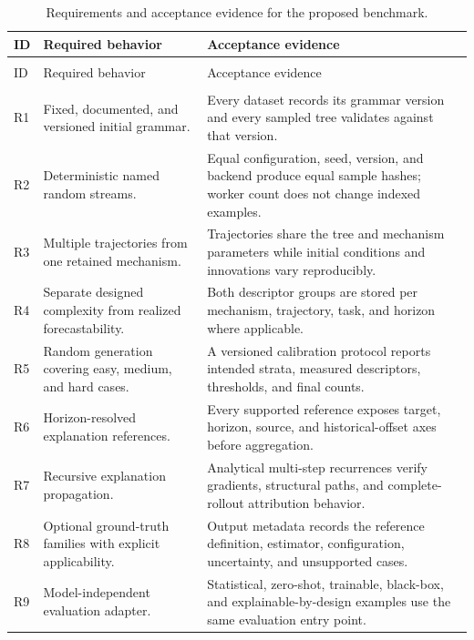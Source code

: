 \begingroup
\small
\renewcommand{\arraystretch}{1.08}
\begin{longtable}{@{}
>{\raggedright\arraybackslash}p{}
>{\raggedright\arraybackslash}p{}
>{\raggedright\arraybackslash}p{}@{}}
\caption{Requirements and acceptance evidence for the proposed benchmark.}
\label{tab:benchmark-requirements}\\
\toprule
ID & Required behavior & Acceptance evidence \\
\midrule
\endfirsthead
\multicolumn{3}{@{}l}{\small\emph{Table~\thetable\ continued}}\\
\toprule
ID & Required behavior & Acceptance evidence \\
\midrule
\endhead
\midrule
\multicolumn{3}{r@{}}{\small\emph{Continued on the next page}}\\
\endfoot
\bottomrule
\endlastfoot
R1 & Fixed, documented, and versioned initial grammar. & Every dataset records its grammar version and every sampled tree validates against that version. \\
R2 & Deterministic named random streams. & Equal configuration, seed, version, and backend produce equal sample hashes; worker count does not change indexed examples. \\
R3 & Multiple trajectories from one retained mechanism. & Trajectories share the tree and mechanism parameters while initial conditions and innovations vary reproducibly. \\
R4 & Separate designed complexity from realized forecastability. & Both descriptor groups are stored per mechanism, trajectory, task, and horizon where applicable. \\
R5 & Random generation covering easy, medium, and hard cases. & A versioned calibration protocol reports intended strata, measured descriptors, thresholds, and final counts. \\
R6 & Horizon-resolved explanation references. & Every supported reference exposes target, horizon, source, and historical-offset axes before aggregation. \\
R7 & Recursive explanation propagation. & Analytical multi-step recurrences verify gradients, structural paths, and complete-rollout attribution behavior. \\
R8 & Optional ground-truth families with explicit applicability. & Output metadata records the reference definition, estimator, configuration, uncertainty, and unsupported cases. \\
R9 & Model-independent evaluation adapter. & Statistical, zero-shot, trainable, black-box, and explainable-by-design examples use the same evaluation entry point. \\

\end{longtable}
